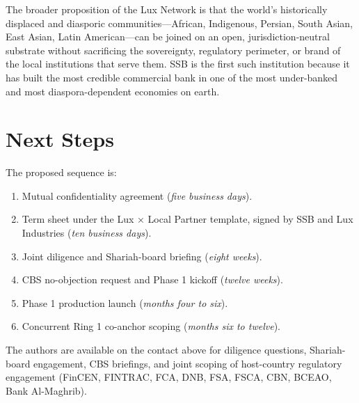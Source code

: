 \documentclass[11pt,letterpaper]{article}
\begin{document}
The broader proposition of the Lux Network is that the world's
historically displaced and diasporic communities---African,
Indigenous, Persian, South Asian, East Asian, Latin American---can be
joined on an open, jurisdiction-neutral substrate without sacrificing
the sovereignty, regulatory perimeter, or brand of the local
institutions that serve them. SSB is the first such institution
because it has built the most credible commercial bank in one of the
most under-banked and most diaspora-dependent economies on earth.

\section{Next Steps}

The proposed sequence is:
\begin{enumerate}[leftmargin=1.6em]
  \item Mutual confidentiality agreement (\textit{five business days}).
  \item Term sheet under the Lux × Local Partner template, signed by
        SSB and Lux Industries (\textit{ten business days}).
  \item Joint diligence and Shariah-board briefing (\textit{eight
        weeks}).
  \item CBS no-objection request and Phase 1 kickoff (\textit{twelve
        weeks}).
  \item Phase 1 production launch (\textit{months four to six}).
  \item Concurrent Ring 1 co-anchor scoping (\textit{months six to
        twelve}).
\end{enumerate}

The authors are available on the contact above for diligence
questions, Shariah-board engagement, CBS briefings, and joint
scoping of host-country regulatory engagement (FinCEN, FINTRAC, FCA,
DNB, FSA, FSCA, CBN, BCEAO, Bank Al-Maghrib).
\end{document}

